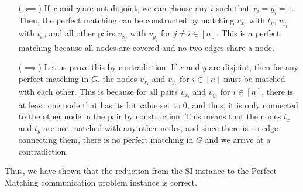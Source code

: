 \documentclass{article}
\begin{document}
\begin{itemize}
    \item[($\impliedby$)] If $x$ and $y$ are not disjoint, we can choose any $i$ such that $x_i = y_i = 1$. Then, the perfect matching can be constructed by matching $v_{x_i}$ with $t_y$, $v_{y_i}$ with $t_x$, and all other pairs $v_{x_j}$ with $v_{y_j}$ for $j \neq i \in [n]$. This is a perfect matching because all nodes are covered and no two edges share a node.
    \item[($\implies$)] Let us prove this by contradiction. If $x$ and $y$ are disjoint, then for any perfect matching in $G$, the nodes $v_{x_i}$ and $v_{y_i}$ for $i \in [n]$ must be matched with each other. This is because for all pairs $v_{x_i}$ and $v_{y_i}$ for $i \in [n]$, there is at least one node that has its bit value set to $0$, and thus, it is only connected to the other node in the pair by construction. This means that the nodes $t_x$ and $t_y$ are not matched with any other nodes, and since there is no edge connecting them, there is no perfect matching in $G$ and we arrive at a contradiction.
\end{itemize}

Thus, we have shown that the reduction from the SI instance to the Perfect Matching communication problem instance is correct.
\end{document}
